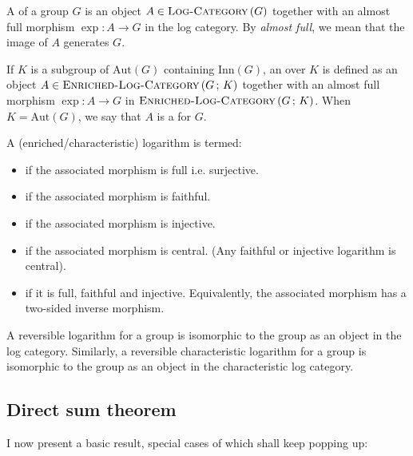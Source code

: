\documentclass[a4paper]{amsart}
\newcommand{\logcategory}[1]{\textsc{Log-Category}\left(#1\right)}
\newcommand{\enrichedlogcategory}[2]{\textsc{Enriched-Log-Category}\left(#1 \, ; \, #2\right)}
\newcommand{\aut}[1]{\text{Aut}\left(#1\right)}
\newcommand{\inn}[1]{\text{Inn}\left(#1\right)}
\begin{document}
\begin{definer}
  A  of a group $G$ is an object $A \in
  \logcategory{G}$ together with an almost full morphism $\exp:A \to
  G$ in the log category. By {\em almost full}, we mean that the image
  of $A$ generates $G$.

  If $K$ is a subgroup of $\aut{G}$ containing $\inn{G}$, an
   over $K$ is defined as an object $A
  \in \enrichedlogcategory{G}{K}$ together with an almost full
  morphism $\exp:A \to G$ in $\enrichedlogcategory{G}{K}$. When $K =
  \aut{G}$, we say that $A$ is a 
  for $G$.

  A (enriched/characteristic) logarithm is termed:

  \begin{itemize}

  \item {} if the associated morphism
    is full i.e. surjective.
  \item {} if the associated
    morphism is faithful.
  \item {} if the associated
    morphism is injective.
  \item {} if the associated
    morphism is central. (Any faithful or injective logarithm is central).
  \item {} if it is full,
    faithful and injective. Equivalently, the associated morphism has
    a two-sided inverse morphism.
  \end{itemize}

  A reversible logarithm for a group is isomorphic to the group as an
  object in the log category. Similarly, a reversible characteristic
  logarithm for a group is isomorphic to the group as an object in the
  characteristic log category.
\end{definer}

\subsection{Direct sum theorem}

I now present a basic result, special cases of which shall keep
popping up:
\end{document}
